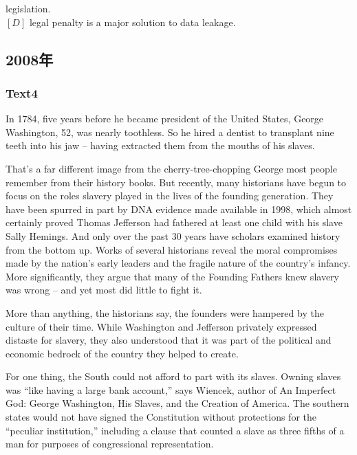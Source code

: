 \documentclass[a4paper]{article}
\begin{document}
legislation.\\$[D]$ legal penalty is a major solution to data leakage.\\\subsection{2008年}
\subsubsection{Text4}

\par
In 1784, five years before he became president of the United States, George Washington, 52, was nearly toothless. So he hired a dentist to transplant nine teeth into his jaw – having extracted them from the mouths of his slaves.

\par
That’s a far different image from the cherry-tree-chopping George most people remember from their history books. But recently, many historians have begun to focus on the roles slavery played in the lives of the founding generation. They have been spurred in part by DNA evidence made available in 1998, which almost certainly proved Thomas Jefferson had fathered at least one child with his slave Sally Hemings. And only over the past 30 years have scholars examined history from the bottom up. Works of several historians reveal the moral compromises made by the nation’s early leaders and the fragile nature of the country’s infancy. More significantly, they argue that many of the Founding Fathers knew slavery was wrong – and yet most did little to fight it.

\par
More than anything, the historians say, the founders were hampered by the culture of their time. While Washington and Jefferson privately expressed distaste for slavery, they also understood that it was part of the political and economic bedrock of the country they helped to create.

\par
For one thing, the South could not afford to part with its slaves. Owning slaves was “like having a large bank account,” says Wiencek, author of An Imperfect God: George Washington, His Slaves, and the Creation of America. The southern states would not have signed the Constitution without protections for the “peculiar institution,” including a clause that counted a slave as three fifths of a man for purposes of congressional representation.
\end{document}
